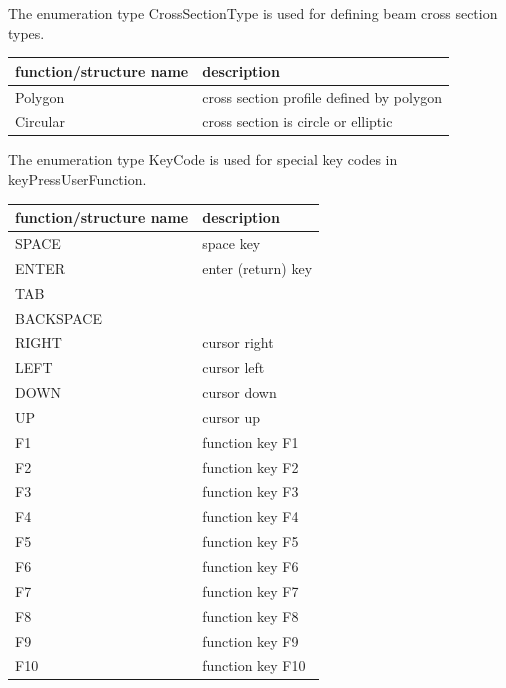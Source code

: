 \label{sec:CrossSectionType}
The enumeration type  CrossSectionType is used for defining beam cross section types.



\begin{center}
\footnotesize
\begin{longtable}{| p{8cm} | p{8cm} |} 
\hline
{\bf function/structure name} & {\bf description}\\ \hline
  Polygon & cross section profile defined by polygon\\ \hline  
  Circular & cross section is circle or elliptic\\ \hline  
\end{longtable}
\end{center}

\label{sec:KeyCode}
The enumeration type  KeyCode is used for special key codes in keyPressUserFunction.



\begin{center}
\footnotesize
\begin{longtable}{| p{8cm} | p{8cm} |} 
\hline
{\bf function/structure name} & {\bf description}\\ \hline
  SPACE & space key\\ \hline  
  ENTER & enter (return) key\\ \hline  
  TAB & \\ \hline  
  BACKSPACE & \\ \hline  
  RIGHT & cursor right\\ \hline  
  LEFT & cursor left\\ \hline  
  DOWN & cursor down\\ \hline  
  UP & cursor up\\ \hline  
  F1 & function key F1\\ \hline  
  F2 & function key F2\\ \hline  
  F3 & function key F3\\ \hline  
  F4 & function key F4\\ \hline  
  F5 & function key F5\\ \hline  
  F6 & function key F6\\ \hline  
  F7 & function key F7\\ \hline  
  F8 & function key F8\\ \hline  
  F9 & function key F9\\ \hline  
  F10 & function key F10\\ \hline  
\end{longtable}
\end{center}

